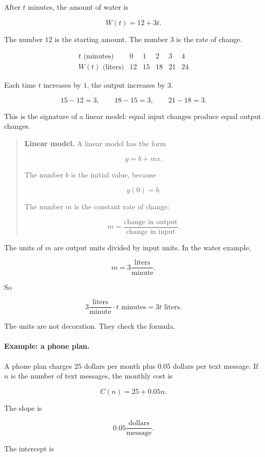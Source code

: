After \(t\) minutes, the amount of water is

\[
W(t)=12+3t.
\]

The number \(12\) is the starting amount. The number \(3\) is the rate of change.

\[
\begin{array}{c|ccccc}
t\text{ (minutes)} & 0 & 1 & 2 & 3 & 4 \\ \hline
W(t)\text{ (liters)} & 12 & 15 & 18 & 21 & 24
\end{array}
\]

Each time \(t\) increases by \(1\), the output increases by \(3\).

\[
15-12=3,\qquad 18-15=3,\qquad 21-18=3.
\]

This is the signature of a linear model: equal input changes produce equal output changes.

\begin{quote}
\textbf{Linear model.}
A linear model has the form

\[
y=b+mx.
\]

The number \(b\) is the initial value, because

\[
y(0)=b.
\]

The number \(m\) is the constant rate of change:

\[
m=\frac{\text{change in output}}{\text{change in input}}.
\]
\end{quote}

The units of \(m\) are output units divided by input units. In the water example,

\[
m=3\frac{\text{liters}}{\text{minute}}.
\]

So

\[
3\frac{\text{liters}}{\text{minute}}\cdot t\text{ minutes}
=
3t\text{ liters}.
\]

The units are not decoration. They check the formula.

\paragraph{Example: a phone plan.}
A phone plan charges \(25\) dollars per month plus \(0.05\) dollars per text message. If \(n\) is the number of text messages, the monthly cost is

\[
C(n)=25+0.05n.
\]

The slope is

\[
0.05\frac{\text{dollars}}{\text{message}}.
\]

The intercept is

